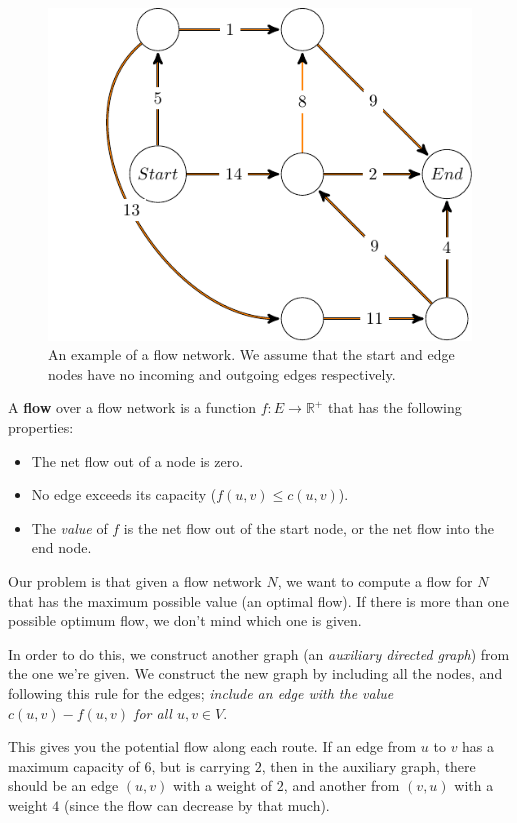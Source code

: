 \begin{figure}[H]
  \centering
  \includegraphics{diagrams/graph8}
  \caption{An example of a flow network. We assume that the start and edge 
    nodes have no incoming and outgoing edges respectively.}
  \label{fig:graph8}
\end{figure}

A \textbf{flow} over a flow network is a function $f : E \rightarrow
\mathbb{R^+}$ that has the following properties:

\begin{itemize}
  \item The net flow out of a node is zero.
  \item No edge exceeds its capacity ($f(u,v) \leq c(u,v)$).
  \item The \textit{value} of $f$ is the net flow out of the start node, or the
    net flow into the end node.
\end{itemize}

Our problem is that given a flow network $N$, we want to compute a flow for $N$
that has the maximum possible value (an optimal flow). If there is more than one
possible optimum flow, we don't mind which one is given.

In order to do this, we construct another graph (an \textit{auxiliary directed
graph}) from the one we're given. We construct the new graph by including all
the nodes, and following this rule for the edges; \textit{include an edge with
the value $c(u,v) - f(u,v)$ for all $u,v \in V$}.

This gives you the potential flow along each route. If an edge from $u$ to $v$
has a maximum capacity of $6$, but is carrying $2$, then in the auxiliary graph,
there should be an edge $(u,v)$ with a weight of $2$, and another from $(v,u)$
with a weight $4$ (since the flow can decrease by that much).

